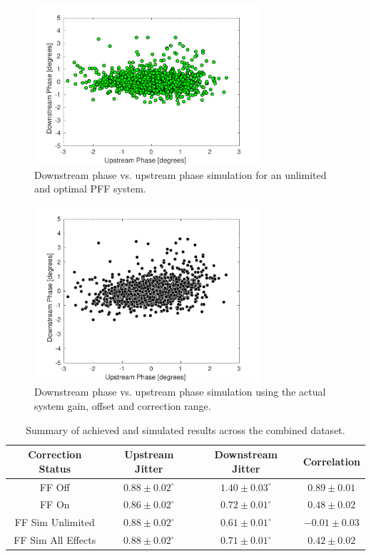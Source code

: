 \begin{figure}
  \centering
  \includegraphics[width=0.75\textwidth]{Figures/feedforward/longFF_scatterFFSimOpt}
  \caption{Downstream phase vs. upstream phase simulation for an unlimited and optimal PFF system.}
  \label{f:longFF_scatterFFSimOpt}
\end{figure}

\begin{figure}
  \centering
  \includegraphics[width=0.75\textwidth]{Figures/feedforward/longFF_scatterFFSimReal}
  \caption{Downstream phase vs. upstream phase simulation using the actual system gain, offset and correction range.}
  \label{f:longFF_scatterFFSimReal}
\end{figure}

\begin{table}
  \begin{center}
    \begin{tabular}{| c | c | c | c |}
	   \hline
       Correction Status & Upstream Jitter & Downstream Jitter & Correlation \\ \hline
       FF Off & \(0.88\pm0.02^\circ\) & \(1.40\pm0.03^\circ\) & \(0.89\pm0.01\) \\
	   FF On & \(0.86\pm0.02^\circ\) & \(0.72\pm0.01^\circ\) & \(0.48\pm0.02\) \\
	   FF Sim Unlimited & \(0.88\pm0.02^\circ\) & \(0.61\pm0.01^\circ\) & \(-0.01\pm0.03\) \\
	   FF Sim All Effects & \(0.88\pm0.02^\circ\) & \(0.71\pm0.01^\circ\) & \(0.42\pm0.02\) \\
    \hline
    \end{tabular}
    \caption{Summary of achieved and simulated results across the combined dataset.}
  	\label{t:LongFF}
  \end{center}
\end{table}



